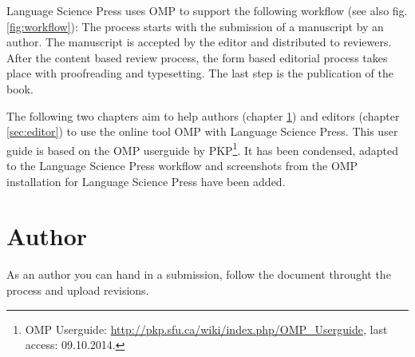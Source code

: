 Language Science Press uses OMP to support the following workflow (see also fig. \ref{fig:workflow}):
The process starts with the submission of a manuscript by an author. The manuscript is accepted by the editor and distributed to reviewers. After the content based review process, the form based editorial process takes place with proofreading and typesetting. The last step is the publication of the book.  

The following two chapters aim to help authors (chapter \ref{sec:author}) and editors (chapter \ref{sec:editor}) to use the online tool OMP with Language Science Press. This user guide is based on the OMP userguide by PKP\footnote{OMP Userguide: \url{http://pkp.sfu.ca/wiki/index.php/OMP_Userguide}, last access: 09.10.2014.}. It has been condensed, adapted to the Language Science Press workflow and screenshots from the OMP installation for Language Science Press have been added.






\newpage


\chapter{Author} \label{sec:author}
As an author you can hand in a submission, follow the document throught the process and upload revisions. 


